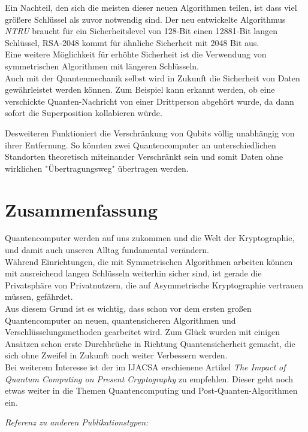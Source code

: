 \documentclass[12pt]{article}
\begin{document}
Ein Nachteil, den sich die meisten dieser neuen Algorithmen teilen, ist dass viel größere Schlüssel als zuvor notwendig sind. Der neu entwickelte Algorithmus \textit{NTRU} braucht für ein Sicherheitslevel von 128-Bit einen 12881-Bit langen Schlüssel, RSA-2048 kommt für ähnliche Sicherheit mit 2048 Bit aus. \\
Eine weitere Möglichkeit für erhöhte Sicherheit ist die Verwendung von symmetrischen Algorithmen mit längeren Schlüsseln. \\

Auch mit der Quantenmechanik selbst wird in Zukunft die Sicherheit von Daten gewährleistet werden können. Zum Beispiel kann erkannt werden, ob eine verschickte Quanten-Nachricht von einer Drittperson abgehört wurde, da dann sofort die Superposition kollabieren würde.

Desweiteren Funktioniert die Verschränkung von Qubits völlig unabhängig von ihrer Entfernung. So könnten zwei Quantencomputer an unterschiedlichen Standorten theoretisch miteinander Verschränkt sein und somit Daten ohne wirklichen "Übertragungsweg" übertragen werden. \cite{mavroeidis2018impact}

\clearpage
\section{Zusammenfassung}

Quantencomputer werden auf uns zukommen und die Welt der Kryptographie, und damit auch unseren Alltag fundamental verändern. \\

Während Einrichtungen, die mit Symmetrischen Algorithmen arbeiten können mit ausreichend langen Schlüsseln weiterhin sicher sind, ist gerade die Privatsphäre von Privatnutzern, die auf Asymmetrische Kryptographie vertrauen müssen, gefährdet. \\

Aus diesem Grund ist es wichtig, dass schon vor dem ersten großen Quantencomputer an neuen, quantensicheren Algorithmen und Verschlüsselungsmethoden gearbeitet wird. Zum Glück wurden mit einigen Ansätzen schon erste Durchbrüche in Richtung Quantensicherheit gemacht, die sich ohne Zweifel in Zukunft noch weiter Verbessern werden. \\

Bei weiterem Interesse ist der im IJACSA erschienene Artikel \textit{The Impact of Quantum Computing on Present Cryptography} \cite{mavroeidis2018impact} zu empfehlen. Dieser geht noch etwas weiter in die Themen Quantencomputing und Post-Quanten-Algorithmen ein.

\textit{Referenz zu anderen Publikationstypen:} \cite{conferencePaper} \cite{techReport}

\clearpage


\end{document}
